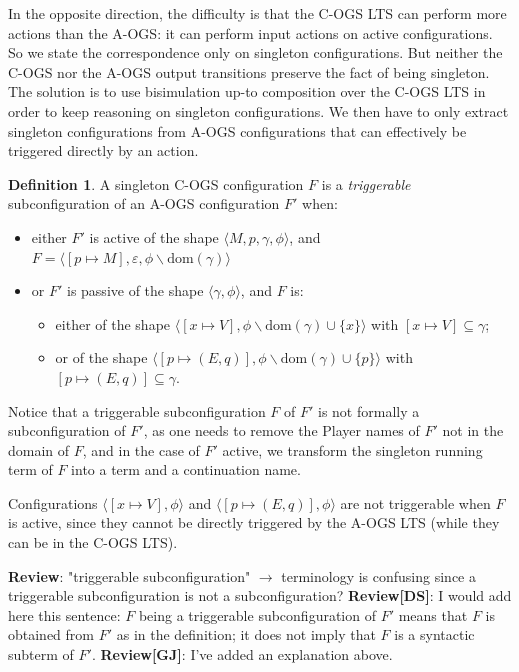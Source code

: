\documentclass[11pt,a4paper]{amsart}
\theoremstyle{plain}
\theoremstyle{definition}
\theoremstyle{defC}
\theoremstyle{thmC}
\theoremstyle{plain}
\numberwithin{equation}{section}
\newcommand{\AOGS}{\mbox{{\rm A-OGS}}\xspace}      %
\newcommand{\COGS}{\mbox{{\rm C-OGS}}\xspace}      %
\newcommand{\FF}{F}
\newcommand{\dom}[1]{\mathrm{dom}(#1)}
\newcommand{\emptymap}{\varepsilon}
\newcommand{\pmap}[2]{[#1 \mapsto #2]}
\newcommand{\conf}[1]{\langle #1\rangle}
\theoremstyle{plain}
\theoremstyle{definition}
\newtheorem{definition}[thm]{Definition}
\newcommand{\reviewComment}[1]{\textbf{Review}: {\color{red} #1}}
\newcommand{\reviewCommentDS}[1]{\textbf{Review[DS]}: {\color{green} #1}}
\newcommand{\reviewCommentGJ}[1]{\textbf{Review[GJ]}: {\color{blue} #1}}
\newcommand{\reviewComment}[1]{}
\newcommand{\reviewCommentDS}[1]{}
\newcommand{\reviewCommentGJ}[1]{}
\begin{document}
\noindent
In the opposite direction, the
difficulty is that the \COGS LTS can perform more actions than the \AOGS:
it can perform input actions on active configurations.
So we state the correspondence only on singleton configurations.
But neither the \COGS nor the \AOGS output transitions preserve the fact of
being singleton.
The solution is to use bisimulation up-to composition over the \COGS LTS
in order to keep reasoning on singleton configurations.
We then have to only extract singleton configurations
from \AOGS configurations that can effectively be triggered directly by an action.

\begin{definition}
A singleton \COGS configuration $\FF$ is 
a \emph{triggerable} subconfiguration of an \AOGS configuration $\FF'$ when:
\begin{itemize}
  \item either $\FF'$ is active of the shape
  $\conf{M,p,\gamma,\phi}$,
  and $\FF = \conf{\pmap{p}{M},\emptymap,\phi \backslash{\dom{\gamma}}}$
  \item or $\FF'$ is passive of the shape
  $\conf{\gamma,\phi}$,
  and $\FF$ is:
  \begin{itemize}
    \item either of the shape
    $\conf{\pmap{x}{V},\phi \backslash{\dom{\gamma}} \cup\{x\}}$
    with $\pmap{x}{V} \subseteq \gamma$;
    \item or of the shape $\conf{\pmap{p}{(E,q)},\phi \backslash{\dom{\gamma}} \cup\{p\}}$
    with $\pmap{p}{(E,q)} \subseteq \gamma$.
  \end{itemize}
\end{itemize}
\end{definition}
\noindent
Notice that a triggerable subconfiguration $\FF$ of $\FF'$ is not formally a subconfiguration of $\FF'$,
as one needs to remove the Player names of $\FF'$ not in the domain of $\FF$, and in the case of $\FF'$ active,
we transform the singleton running term of $\FF$ into a term and a continuation name.

Configurations $\conf{\pmap{x}{V},\phi}$ and
$\conf{\pmap{p}{(E,q)},\phi}$ are not triggerable 
when $\FF$ is active,
since they cannot be directly triggered by the \AOGS LTS
(while they can be in the \COGS LTS).


\reviewComment{"triggerable subconfiguration" $\rightarrow$ terminology is confusing since
a triggerable subconfiguration is not a subconfiguration?}
\reviewCommentDS{I would add here this sentence:   
 $\FF$ being  
a triggerable subconfiguration of $\FF'$  means that $\FF$ is obtained from $\FF'$ as in
the definition; it 
does not imply that  $\FF$ is a syntactic subterm
of $\FF'$.}
\reviewCommentGJ{I've added an explanation above.}
\end{document}
